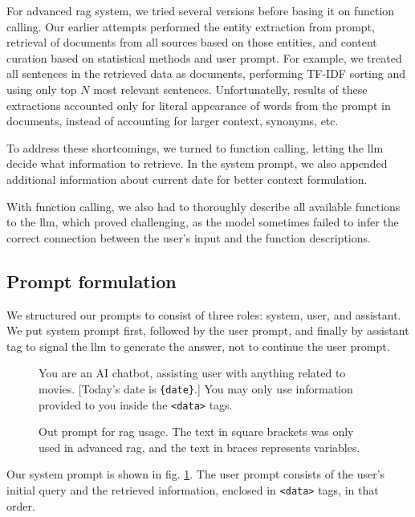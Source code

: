 \documentclass[fleqn,moreauthors,10pt]{ds_report}
\begin{document}
For advanced \ac{rag} system, we tried several versions before basing it on function calling. Our earlier attempts performed the entity extraction from prompt, retrieval of documents from all sources based on those entities, and content curation based on statistical methods and user prompt. For example, we treated all sentences in the retrieved data as documents, performing TF-IDF sorting and using only top $N$ most relevant sentences. Unfortunatelly, results of these extractions accounted only for literal appearance of words from the prompt in documents, instead of accounting for larger context, synonyms, etc.

To address these shortcomings, we turned to function calling, letting the \ac{llm} decide what information to retrieve. In the system prompt, we also appended additional information about current date for better context formulation.

With function calling, we also had to thoroughly describe all available functions to the \ac{llm}, which proved challenging, as the model sometimes failed to infer the correct connection between the user's input and the function descriptions.

\subsection*{Prompt formulation}

We structured our prompts to consist of three roles: system, user, and assistant. We put system prompt first, followed by the user prompt, and finally by assistant tag to signal the \ac{llm} to generate the answer, not to continue the user prompt.



\begin{figure}[h!]
	\begin{tcolorbox}
		You are an AI chatbot, assisting user with anything related to movies. [Today's date is \verb|{date}|.] You may only use information provided to you inside the \verb|<data>| tags.
	\end{tcolorbox}
	\caption{Out prompt for \ac{rag} usage. The text in square brackets was only used in advanced \ac{rag}, and the text in braces represents variables.}
	\label{fig:prompt}
\end{figure}

Our system prompt is shown in fig. \ref{fig:prompt}. The user prompt consists of the user's initial query and the retrieved information, enclosed in \verb|<data>| tags, in that order.
\end{document}
